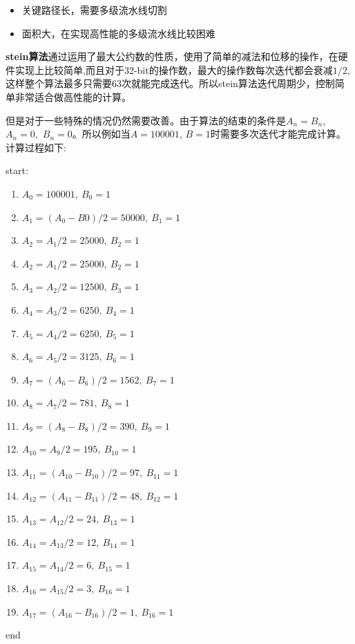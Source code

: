 \documentclass[12pt]{article}
\begin{document}
\begin{itemize}
\item 关键路径长，需要多级流水线切割
\item 面积大，在实现高性能的多级流水线比较困难
\end{itemize}

\textbf{stein算法}通过运用了最大公约数的性质，使用了简单的减法和位移的操作，在硬件实现上比较简单,而且对于32-bit的操作数，最大的操作数每次迭代都会衰减$1/2$,这样整个算法最多只需要63次就能完成迭代。所以stein算法迭代周期少，控制简单非常适合做高性能的计算。

但是对于一些特殊的情况仍然需要改善。由于算法的结束的条件是$A_{n} = B_{n}$,~$A_{n} = 0$,~$B_{n} = 0$。所以例如当$A = 100001$, $B = 1$时需要多次迭代才能完成计算。计算过程如下:

start:
\begin{enumerate}
\item $A_{0} = 100001,~B_{0} = 1$
\item $A_{1} = (A_{0} - B{0})/2 = 50000,~B_{1} = 1$
\item $A_{2} = A_{1}/2 = 25000,~B_{2} = 1$
\item $A_{2} = A_{1}/2 = 25000,~B_{2} = 1$
\item $A_{3} = A_{2}/2 = 12500,~B_{3} = 1$
\item $A_{4} = A_{3}/2 = 6250,~B_{4} = 1$
\item $A_{5} = A_{4}/2 = 6250,~B_{5} = 1$
\item $A_{6} = A_{5}/2 = 3125,~B_{6} = 1$
\item $A_{7} = (A_{6} - B_{6})/2 = 1562,~B_{7} = 1$ 
\item $A_{8} = A_{7}/2 = 781,~B_{8} = 1$ 
\item $A_{9} = (A_{8} - B_{8})/2 = 390,~B_{9} = 1$ 
\item $A_{10} = A_{9}/2 = 195,~B_{10} = 1$
\item $A_{11} = (A_{10} - B_{10})/2 = 97,~B_{11} = 1$ 
\item $A_{12} = (A_{11} - B_{11})/2 = 48,~B_{12} = 1$ 
\item $A_{13} = A_{12}/2 = 24,~B_{13} = 1$
\item $A_{14} = A_{13}/2 = 12,~B_{14} = 1$
\item $A_{15} = A_{14}/2 = 6,~B_{15} = 1$
\item $A_{16} = A_{15}/2 = 3,~B_{16} = 1$
\item $A_{17} = (A_{16} - B_{16})/2 = 1,~B_{16} = 1$ 
\end{enumerate}
end
\end{document}
